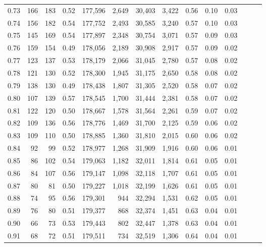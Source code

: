\begin{tabular}{rrrrrrrrrrrrrr}
0.73 &    166 &  183 &  0.52 &  177,596 &    2,649 &  30,403 &   3,422 &  0.56 &  0.10 &      0.03 \\
0.74 &    156 &  182 &  0.54 &  177,752 &    2,493 &  30,585 &   3,240 &  0.57 &  0.10 &      0.03 \\
0.75 &    145 &  169 &  0.54 &  177,897 &    2,348 &  30,754 &   3,071 &  0.57 &  0.09 &      0.03 \\
0.76 &    159 &  154 &  0.49 &  178,056 &    2,189 &  30,908 &   2,917 &  0.57 &  0.09 &      0.02 \\
0.77 &    123 &  137 &  0.53 &  178,179 &    2,066 &  31,045 &   2,780 &  0.57 &  0.08 &      0.02 \\
0.78 &    121 &  130 &  0.52 &  178,300 &    1,945 &  31,175 &   2,650 &  0.58 &  0.08 &      0.02 \\
0.79 &    138 &  130 &  0.49 &  178,438 &    1,807 &  31,305 &   2,520 &  0.58 &  0.07 &      0.02 \\
0.80 &    107 &  139 &  0.57 &  178,545 &    1,700 &  31,444 &   2,381 &  0.58 &  0.07 &      0.02 \\
0.81 &    122 &  120 &  0.50 &  178,667 &    1,578 &  31,564 &   2,261 &  0.59 &  0.07 &      0.02 \\
0.82 &    109 &  136 &  0.56 &  178,776 &    1,469 &  31,700 &   2,125 &  0.59 &  0.06 &      0.02 \\
0.83 &    109 &  110 &  0.50 &  178,885 &    1,360 &  31,810 &   2,015 &  0.60 &  0.06 &      0.02 \\
0.84 &     92 &   99 &  0.52 &  178,977 &    1,268 &  31,909 &   1,916 &  0.60 &  0.06 &      0.01 \\
0.85 &     86 &  102 &  0.54 &  179,063 &    1,182 &  32,011 &   1,814 &  0.61 &  0.05 &      0.01 \\
0.86 &     84 &  107 &  0.56 &  179,147 &    1,098 &  32,118 &   1,707 &  0.61 &  0.05 &      0.01 \\
0.87 &     80 &   81 &  0.50 &  179,227 &    1,018 &  32,199 &   1,626 &  0.61 &  0.05 &      0.01 \\
0.88 &     74 &   95 &  0.56 &  179,301 &      944 &  32,294 &   1,531 &  0.62 &  0.05 &      0.01 \\
0.89 &     76 &   80 &  0.51 &  179,377 &      868 &  32,374 &   1,451 &  0.63 &  0.04 &      0.01 \\
0.90 &     66 &   73 &  0.53 &  179,443 &      802 &  32,447 &   1,378 &  0.63 &  0.04 &      0.01 \\
0.91 &     68 &   72 &  0.51 &  179,511 &      734 &  32,519 &   1,306 &  0.64 &  0.04 &      0.01 \\

\end{tabular}
